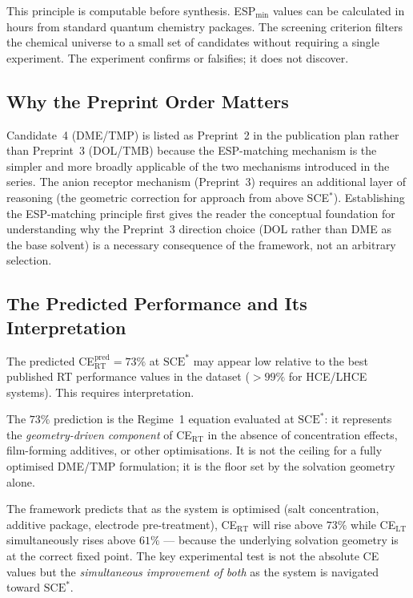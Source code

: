 \documentclass[11pt]{article}
\theoremstyle{plain}
\theoremstyle{definition}
\theoremstyle{remark}
\begin{document}
This principle is computable before synthesis.  ESP$_{\min}$ values can
be calculated in hours from standard quantum chemistry packages.  The
screening criterion filters the chemical universe to a small set of
candidates without requiring a single experiment.  The experiment confirms
or falsifies; it does not discover.

\subsection{Why the Preprint Order Matters}

Candidate~4 (DME/TMP) is listed as Preprint~2 in the publication plan
rather than Preprint~3 (DOL/TMB) because the ESP-matching mechanism is
the simpler and more broadly applicable of the two mechanisms introduced
in the series.  The anion receptor mechanism (Preprint~3) requires an
additional layer of reasoning (the geometric correction for approach from
above SCE$^{*}$).  Establishing the ESP-matching principle first gives
the reader the conceptual foundation for understanding why the Preprint~3
direction choice (DOL rather than DME as the base solvent) is a necessary
consequence of the framework, not an arbitrary selection.

\subsection{The Predicted Performance and Its Interpretation}

The predicted CE$_{\mathrm{RT}}^{\mathrm{pred}} = 73\%$ at
$\mathrm{SCE}^{*}$ may appear low relative to the best published RT
performance values in the dataset ($> 99\%$ for HCE/LHCE systems).
This requires interpretation.

The $73\%$ prediction is the Regime~1 equation evaluated at
$\mathrm{SCE}^{*}$: it represents the \emph{geometry-driven component}
of CE$_{\mathrm{RT}}$ in the absence of concentration effects,
film-forming additives, or other optimisations.  It is not the ceiling
for a fully optimised DME/TMP formulation; it is the floor set by the
solvation geometry alone.

The framework predicts that as the system is optimised (salt
concentration, additive package, electrode pre-treatment), CE$_{\mathrm{RT}}$
will rise above $73\%$ while CE$_{\mathrm{LT}}$ simultaneously rises
above $61\%$ --- because the underlying solvation geometry is at the
correct fixed point.  The key experimental test is not the absolute CE
values but the \emph{simultaneous improvement of both} as the system is
navigated toward $\mathrm{SCE}^{*}$.
\end{document}

